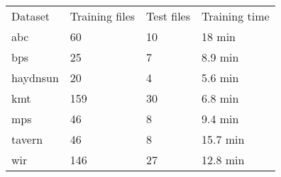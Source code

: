 \begin{tabular}{llll}
Dataset        & Training files & Test files & Training time \\
\gls{abc}      & 60             & 10         & 18 min        \\
\gls{bps}      & 25             & 7          & 8.9 min       \\
\gls{haydnsun} & 20             & 4          & 5.6 min       \\
\gls{kmt}      & 159            & 30         & 6.8 min       \\
\gls{mps}      & 46             & 8          & 9.4 min       \\
\gls{tavern}   & 46             & 8          & 15.7 min      \\
\gls{wir}      & 146            & 27         & 12.8 min     
\end{tabular}
